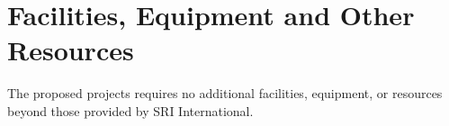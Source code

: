 \setcounter{page}{0}
\newpage
\setcounter{section}{8}  %
\section{Facilities, Equipment and Other Resources}

The proposed projects requires no additional facilities, equipment, 
or resources beyond those provided by SRI International.